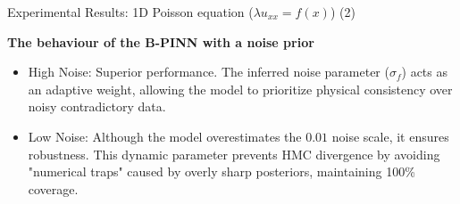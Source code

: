 \documentclass[10pt, aspectratio=169]{beamer}
\begin{document}
\begin{frame}{Experimental Results: 1D Poisson equation ($\lambda u_{xx} = f(x)$) (2)}

  
\begin{table}[h]
\centering
{}
\caption{\tiny Metrics for the 1D poisson equation forward problem with measurement noise 0.1}
\label{tab:5x5}
\end{table}



\begin{table}[h]
\centering
{}
\caption{ \tiny Metrics for the 1D poisson equation forward problem with measurement noise 0.01}
\label{tab:5x5}
\end{table}





\textbf{The behaviour of the B-PINN with a noise prior}
\begin{itemize}
    \item High Noise: Superior performance. The inferred noise parameter ($\sigma_f$) acts as an adaptive weight, allowing the model to prioritize physical consistency over noisy contradictory data.
    \item Low Noise: Although the model overestimates the $0.01$ noise scale, it ensures robustness. This dynamic parameter prevents HMC divergence by avoiding "numerical traps" caused by overly sharp posteriors, maintaining 100\% coverage.
    \end{itemize}
\end{frame}
\end{document}

